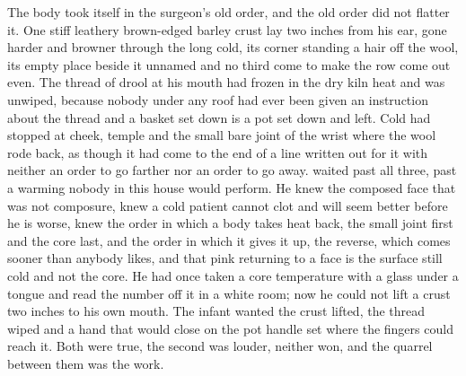 The body took itself in the surgeon's old order, and the old order did not flatter it. One stiff leathery brown-edged barley crust lay two inches from his ear, gone harder and browner through the long cold, its corner standing a hair off the wool, its empty place beside it unnamed and no third come to make the row come out even. The thread of drool at his mouth had frozen in the dry kiln heat and was unwiped, because nobody under any roof had ever been given an instruction about the thread and a basket set down is a pot set down and left. Cold had stopped at cheek, temple and the small bare joint of the wrist where the wool rode back, as though it had come to the end of a line written out for it with neither an order to go farther nor an order to go away.  waited past all three, past a warming nobody in this house would perform. He knew the composed face that was not composure, knew a cold patient cannot clot and will seem better before he is worse, knew the order in which a body takes heat back, the small joint first and the core last, and the order in which it gives it up, the reverse, which comes sooner than anybody likes, and that pink returning to a face is the surface still cold and not the core. He had once taken a core temperature with a glass under a tongue and read the number off it in a white room; now he could not lift a crust two inches to his own mouth. The infant wanted the crust lifted, the thread wiped and a hand that would close on the pot handle set where the fingers could reach it. Both were true, the second was louder, neither won, and the quarrel between them was the work.

\scenebreak

